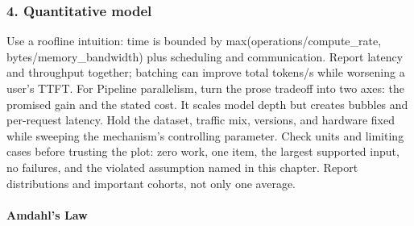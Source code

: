 \subsubsection*{4. Quantitative model}
Use a roofline intuition: time is bounded by max(operations/compute\_rate, bytes/memory\_bandwidth) plus scheduling and communication. Report latency and throughput together; batching can improve total tokens/s while worsening a user's TTFT.
For Pipeline parallelism, turn the prose tradeoff into two axes: the promised gain and the stated cost. It scales model depth but creates bubbles and per-request latency. Hold the dataset, traffic mix, versions, and hardware fixed while sweeping the mechanism's controlling parameter.
Check units and limiting cases before trusting the plot: zero work, one item, the largest supported input, no failures, and the violated assumption named in this chapter. Report distributions and important cohorts, not only one average.
\paragraph{Amdahl's Law}
